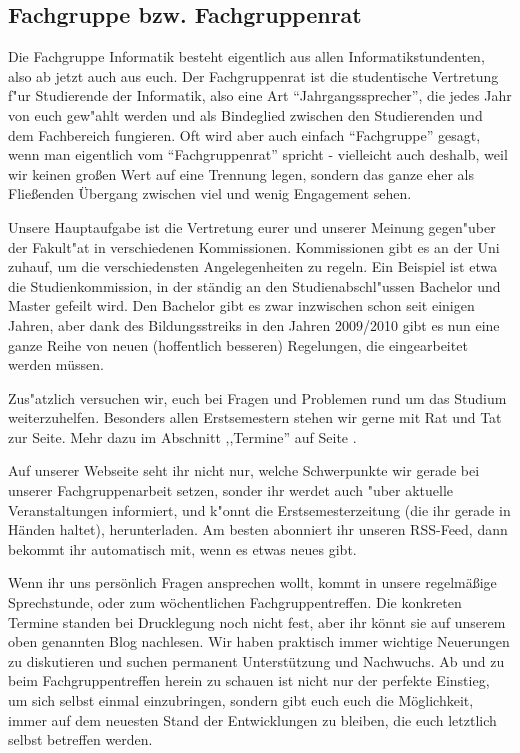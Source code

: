 \label{fachgruppe}\subsection{Fachgruppe bzw. Fachgruppenrat}

Die Fachgruppe Informatik besteht eigentlich aus allen 
Informatikstundenten, also ab jetzt auch aus euch. Der Fachgruppenrat 
ist die studentische Vertretung f"ur Studierende der Informatik, also 
eine Art "`Jahrgangssprecher"', die jedes Jahr von euch gew"ahlt werden 
und als Bindeglied zwischen den Studierenden und dem Fachbereich 
fungieren. Oft wird aber auch einfach "`Fachgruppe"' gesagt, wenn man 
eigentlich vom "`Fachgruppenrat"' spricht - vielleicht auch deshalb, 
weil wir keinen großen Wert auf eine Trennung legen, sondern das ganze
eher als Fließenden Übergang zwischen viel und wenig Engagement sehen.

Unsere Hauptaufgabe ist die Vertretung eurer und unserer Meinung 
gegen"uber der Fakult"at in verschiedenen Kommissionen. Kommissionen 
gibt es an der Uni zuhauf, um die verschiedensten Angelegenheiten zu 
regeln. Ein Beispiel ist etwa die Studienkommission, in der ständig 
an den Studienabschl"ussen Bachelor und Master gefeilt wird. Den Bachelor 
gibt es zwar inzwischen schon seit einigen Jahren, aber dank des 
Bildungsstreiks in den Jahren 2009/2010 gibt es nun eine ganze Reihe %
von neuen (hoffentlich besseren) Regelungen, die eingearbeitet werden 
müssen.

Zus"atzlich versuchen wir, euch bei Fragen und Problemen rund um das 
Studium weiterzuhelfen. Besonders allen Erstsemestern stehen wir 
gerne mit Rat und Tat zur Seite.  Mehr dazu im Abschnitt ,,Termine'' auf
Seite \pageref{termine}.

Auf unserer Webseite \mbox{} seht ihr nicht 
nur, welche Schwerpunkte wir gerade bei unserer Fachgruppenarbeit setzen, 
sonder ihr werdet auch "uber aktuelle Veranstaltungen informiert, und k"onnt 
die Erstsemesterzeitung (die ihr gerade in Händen haltet), herunterladen. 
Am besten abonniert ihr unseren RSS-Feed, dann bekommt ihr automatisch 
mit, wenn es etwas neues gibt.

Wenn ihr uns persönlich Fragen ansprechen wollt, kommt 
in unsere regelmäßige Sprechstunde, oder zum wöchentlichen Fachgruppentreffen.
Die konkreten Termine standen bei Drucklegung noch nicht fest, aber ihr könnt
sie auf unserem oben genannten Blog nachlesen. Wir haben praktisch immer wichtige 
Neuerungen zu diskutieren und suchen permanent Unterstützung und 
Nachwuchs. Ab und zu beim Fachgruppentreffen herein zu schauen ist 
nicht nur der perfekte Einstieg, um sich selbst einmal einzubringen, 
sondern gibt euch euch die Möglichkeit, immer auf dem neuesten Stand 
der Entwicklungen zu bleiben, die euch letztlich selbst betreffen werden.


